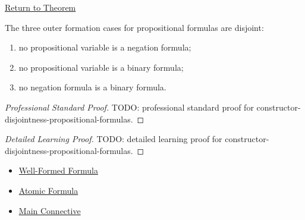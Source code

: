 \newpage
{}
\label{prf:constructor-disjointness-propositional-formulas}

\begin{remark*}[Return]
\hyperref[lem:constructor-disjointness-propositional-formulas]{Return to Theorem}
\end{remark*}

\begin{theorem*}
The three outer formation cases for propositional formulas are disjoint:
\begin{enumerate}
\item no propositional variable is a negation formula;
\item no propositional variable is a binary formula;
\item no negation formula is a binary formula.
\end{enumerate}
\end{theorem*}

\begin{proof}[Professional Standard Proof]
\LRAProofBodyStart
TODO: professional standard proof for constructor-disjointness-propositional-formulas.
\end{proof}

\begin{proof}[Detailed Learning Proof]
\LRAProofBodyStart
TODO: detailed learning proof for constructor-disjointness-propositional-formulas.
\end{proof}

\begin{remark*}
\end{remark*}

\begin{dependencies}
\begin{itemize}
  \item \hyperref[def:well-formed-formula]{Well-Formed Formula}
  \item \hyperref[def:atomic-formula-propositional-logic]{Atomic Formula}
  \item \hyperref[def:main-connective-propositional-logic]{Main Connective}
\end{itemize}
\end{dependencies}

\clearpage
